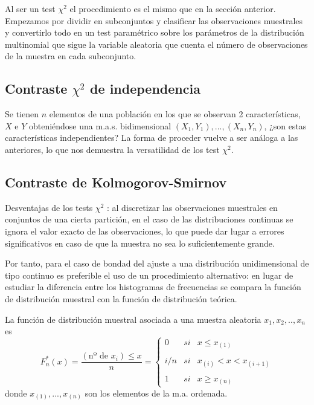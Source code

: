 \documentclass[a4paper,12pt]{article}
\begin{document}
Al ser un test $\chi ^2$ el procedimiento es el mismo que en la sección anterior. Empezamos por dividir en subconjuntos y clasificar las observaciones muestrales y convertirlo todo en un test paramétrico sobre los parámetros de la distribución multinomial que sigue la variable aleatoria que cuenta el número de observaciones de la muestra en cada subconjunto. 
\subsection{Contraste $\chi^2$ de independencia}
Se tienen $n$ elementos de una población en los que se observan 2 características, $X$ e $Y$ obteniéndose una m.a.s. bidimensional $(X_1,Y_1),...,(X_n,Y_n)$, ¿son estas características independientes? La forma de proceder vuelve a ser análoga a las anteriores, lo que nos demuestra la versatilidad de los test $\chi^2$.

\subsection{Contraste de Kolmogorov-Smirnov }
Desventajas de los tests $\chi^2$ : al discretizar las observaciones muestrales en conjuntos de una cierta partición, en el caso de las distribuciones continuas se ignora el valor exacto de las observaciones, lo que puede dar lugar a errores significativos en caso de que la muestra no sea lo suficientemente grande.

Por tanto, para el caso de bondad del ajuste a una distribución unidimensional de tipo continuo es preferible el uso de un procedimiento alternativo: en lugar de estudiar la diferencia entre los histogramas de frecuencias se compara la función de distribución muestral con la función de distribución teórica.

La función de distribución muestral asociada a una muestra aleatoria $x_1, x_2,..,x_n$ es 
$$F^*_n(x) = \frac{(\textrm{nº de $x_i$}) \leq x}{n} = \left\{ \begin{array}{lcc}
             0 &   si  & x \leq x_{(1)} \\
             \\ i/n &  si & x_{(i)} < x < x_{(i+1)} \\
             \\ 1 &  si  & x \geq x_{(n)}
             \end{array}
   \right. $$
donde $x_{(1)},...,x_{(n)}$ son los elementos de la m.a. ordenada.
\end{document}
